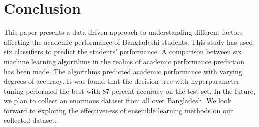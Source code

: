 \documentclass[conference]{IEEEtran}
\begin{document}
\section{Conclusion}
This paper presents a data-driven approach to understanding different factors affecting the academic performance of Bangladeshi students. This study has used six classifiers to predict the students’ performance. A comparison between six machine learning algorithms in the realms of academic performance prediction has been made. The algorithms predicted academic performance with varying degrees of accuracy. It was found that the decision tree with hyperparameter tuning performed the best with 87 percent accuracy on the test set. In the future, we plan to collect an enormous dataset from all over Bangladesh. We look forward to exploring the effectiveness of ensemble learning methods on our collected dataset.


\vspace{12pt}
\color{red}
\end{document}
